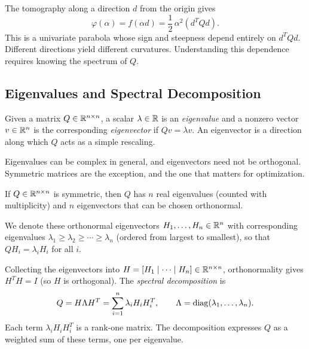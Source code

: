 The tomography along a direction $d$ from the origin gives
\begin{equation}\label{eq:tomography-quad}
	\varphi(\alpha) = f(\alpha d) = \frac{1}{2}\, \alpha^2 (d^T Q d).
\end{equation}
This is a univariate parabola whose sign and steepness depend entirely on $d^T Q d$.
Different directions yield different curvatures.
Understanding this dependence requires knowing the spectrum of $Q$.


\subsection{Eigenvalues and Spectral Decomposition}\label{sec:spectral-decomp}

\begin{definition}\label{def:eigen}
	Given a matrix $Q \in \mathbb{R}^{n \times n}$, a scalar $\lambda \in \mathbb{R}$ is an \emph{eigenvalue} and a nonzero vector $v \in \mathbb{R}^n$ is the corresponding \emph{eigenvector} if $Qv = \lambda v$.
	An eigenvector is a direction along which $Q$ acts as a simple rescaling.
\end{definition}

Eigenvalues can be complex in general, and eigenvectors need not be orthogonal.
Symmetric matrices are the exception, and the one that matters for optimization.

\begin{theorem}\label{thm:sym-eigen}
	If $Q \in \mathbb{R}^{n \times n}$ is symmetric, then $Q$ has $n$ real eigenvalues (counted with multiplicity) and $n$ eigenvectors that can be chosen orthonormal.
\end{theorem}

We denote these orthonormal eigenvectors $H_1, \dots, H_n \in \mathbb{R}^n$ with corresponding eigenvalues $\lambda_1 \geq \lambda_2 \geq \cdots \geq \lambda_n$ (ordered from largest to smallest), so that $Q H_i = \lambda_i H_i$ for all $i$.

\begin{definition}\label{def:spectral-decomp}
	Collecting the eigenvectors into $H = [H_1 \mid \cdots \mid H_n] \in \mathbb{R}^{n \times n}$, orthonormality gives $H^T H = I$ (so $H$ is orthogonal).
	The \emph{spectral decomposition} is
	\begin{equation}\label{eq:spectral-decomp}
		Q = H \Lambda H^T = \sum_{i=1}^{n} \lambda_i H_i H_i^T,
		\qquad \Lambda = \operatorname{diag}(\lambda_1, \dots, \lambda_n).
	\end{equation}
	Each term $\lambda_i H_i H_i^T$ is a rank-one matrix.
	The decomposition expresses $Q$ as a weighted sum of these terms, one per eigenvalue.
\end{definition}

